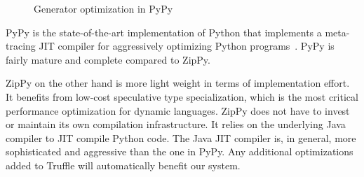 \begin{figure}
\centering
{}

\caption{Generator optimization in PyPy}
\label{fig:pypy_generator_inlining}
\end{figure}

PyPy is the state-of-the-art implementation of Python that implements a meta-tracing JIT compiler for aggressively optimizing Python programs~\cite{bolz.etal09,Rigo2006}.
PyPy is fairly mature and complete compared to ZipPy.

ZipPy on the other hand is more light weight in terms of implementation effort.
It benefits from low-cost speculative type specialization, which is the most critical performance optimization for dynamic languages.
ZipPy does not have to invest or maintain its own compilation infrastructure.
It relies on the underlying Java compiler to JIT compile Python code.
The Java JIT compiler is, in general, more sophisticated and aggressive than the one in PyPy.
Any additional optimizations added to Truffle will automatically benefit our system.

